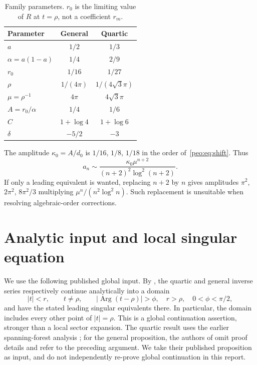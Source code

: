 \documentclass[11pt]{article}
\numberwithin{equation}{section}
\theoremstyle{remark}\newtheorem{remark}[theorem]{Remark}
\DeclareMathOperator{\Arg}{Arg}
\begin{document}
\begin{table}[ht]
\centering\small
\begin{tabular}{@{}lcc@{}}\toprule
Parameter & General & Quartic\\\midrule
$a$ & $1/2$ & $1/3$\\
$\alpha=a(1-a)$ & $1/4$ & $2/9$\\
$r_0$ & $1/16$ & $1/27$\\
$\rho$ & $1/(4\pi)$ & $1/(4\sqrt3\pi)$\\
$\mu=\rho^{-1}$ & $4\pi$ & $4\sqrt3\pi$\\
$A=r_0/\alpha$ & $1/4$ & $1/6$\\
$C$ & $1+\log4$ & $1+\log6$\\
$\delta$ & $-5/2$ & $-3$\\\bottomrule
\end{tabular}
\caption{Family parameters. $r_0$ is the limiting value of $R$ at $t=\rho$, not a coefficient $r_m$.}\label{peo:tab:parameters}
\end{table}
The amplitude $\kappa_0=A/d_0$ is $1/16$, $1/8$, $1/18$ in the order of~\eqref{peo:eq:shift}. Thus
\begin{equation}
 a_n\sim\frac{\kappa_0\mu^{n+2}}{(n+2)^2\log^2(n+2)}.
 \label{peo:eq:leading}
\end{equation}
If only a leading equivalent is wanted, replacing $n+2$ by $n$ gives amplitudes $\pi^2$, $2\pi^2$, $8\pi^2/3$ multiplying $\mu^n/(n^2\log^2n)$. Such replacement is unsuitable when resolving algebraic-order corrections.

\section{Analytic input and local singular equation}\label{peo:sec:analytic}
We use the following published global input. By \cite[Propositions 8.2 and 8.3]{BMEP}, the quartic and general inverse series respectively continue analytically into a domain
\begin{equation}
 |t|<r,\qquad t\ne\rho,\qquad |\Arg(t-\rho)|>\phi,
 \quad r>\rho,\quad 0<\phi<\pi/2,\label{peo:eq:Delta}
\end{equation}
and have the stated leading singular equivalents there. In particular, the domain includes every other point of $|t|=\rho$. This is a global continuation assertion, stronger than a local sector expansion. The quartic result uses the earlier spanning-forest analysis \cite[Proposition 8.4]{BC}; for the general proposition, the authors of \cite{BMEP} omit proof details and refer to the preceding argument. We take their published proposition as input, and do not independently re-prove global continuation in this report.
\end{document}
